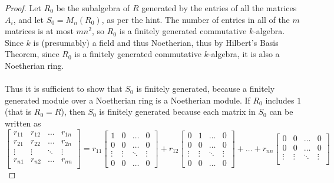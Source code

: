 \documentclass{article}
\newenvironment{problem}[2][Problem]{\begin{trivlist}
\item[\hskip \labelsep {\bfseries #1}\hskip \labelsep {\bfseries #2.}]}{\end{trivlist}}
\begin{document}
\pagebreak
\begin{problem}{3}
\end{problem}

\begin{proof}
  Let $R_0$ be the subalgebra of $R$ generated by the entries of all the
  matrices $A_i$, and let $S_0 = M_n(R_0)$, as per the hint.
  The number of entries in all of the $m$ matrices is at most $mn^2$, so $R_0$
  is a finitely generated commutative $k$-algebra. Since $k$ is (presumably) a
  field and thus Noetherian, thus by Hilbert's Basis Theorem,
  since $R_0$ is a finitely generated commutative $k$-algebra, it is also a
  Noetherian ring.
  \\~\\
  Thus it is sufficient to show that $S_0$ is finitely generated, because a
  finitely generated module over a Noetherian ring is a Noetherian module.
  If $R_0$ includes $1$ (that is $R_0 = R$), then $S_0$ is finitely generated
  because each matrix in $S_0$ can be written as \[
  \begin{bmatrix}
    r_{11} & r_{12} & \hdots & r_{1n} \\
    r_{21} & r_{22} & \hdots & r_{2n} \\
    \vdots & \vdots & \ddots & \vdots \\
    r_{n1} & r_{n2} & \hdots & r_{nn} \\
  \end{bmatrix} = r_{11} \begin{bmatrix}
      1 & 0 & \hdots & 0 \\
      0 & 0 & \hdots & 0 \\
      \vdots & \vdots & \ddots & \vdots \\
      0 & 0 & \hdots & 0
    \end{bmatrix}
    + r_{12} \begin{bmatrix}
      0 & 1 & \hdots & 0 \\
      0 & 0 & \hdots & 0 \\
      \vdots & \vdots & \ddots & \vdots \\
      0 & 0 & \hdots & 0
    \end{bmatrix}
    + \hdots + r_{nn} \begin{bmatrix}
      0 & 0 & \hdots & 0 \\
      0 & 0 & \hdots & 0 \\
      \vdots & \vdots & \ddots & \vdots \\

\end{bmatrix}\]
\end{proof}
\end{document}
